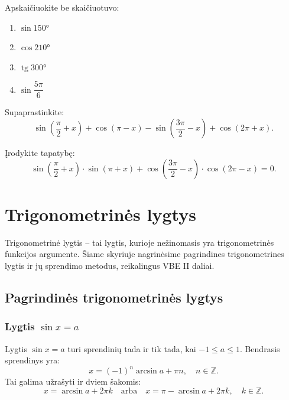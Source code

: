 \begin{exercise}
  Apskaičiuokite be skaičiuotuvo:
  \begin{enumerate}[label=\alph*)]
    \item $\sin 150°$
    \item $\cos 210°$
    \item $\operatorname{tg} 300°$
    \item $\sin\dfrac{5\pi}{6}$
  \end{enumerate}
\end{exercise}

\begin{exercise}
  Supaprastinkite:
  \[
    \sin\!\left(\frac{\pi}{2}+x\right)
    + \cos(\pi - x)
    - \sin\!\left(\frac{3\pi}{2}-x\right)
    + \cos(2\pi + x).
  \]
\end{exercise}

\begin{exercise}
  Įrodykite tapatybę:
  \[
    \sin\!\left(\frac{\pi}{2}+x\right)\cdot\sin(\pi+x)
    + \cos\!\left(\frac{3\pi}{2}-x\right)\cdot\cos(2\pi-x) = 0.
  \]
\end{exercise}

\section{Trigonometrinės lygtys}

Trigonometrinė lygtis – tai lygtis, kurioje nežinomasis yra trigonometrinės funkcijos argumente. Šiame skyriuje nagrinėsime pagrindines trigonometrines lygtis ir jų sprendimo metodus, reikalingus VBE II daliai.

\subsection{Pagrindinės trigonometrinės lygtys}

\subsubsection{Lygtis \(\sin x = a\)}

\begin{definition}
Lygtis \(\sin x = a\) turi sprendinių tada ir tik tada, kai \(-1 \leq a \leq 1\). Bendrasis sprendinys yra:
\[
x = (-1)^n \arcsin a + \pi n, \quad n \in \mathbb{Z}.
\]
Tai galima užrašyti ir dviem šakomis:
\[
x = \arcsin a + 2\pi k \quad \text{arba} \quad x = \pi - \arcsin a + 2\pi k, \quad k \in \mathbb{Z}.
\]
\end{definition}

